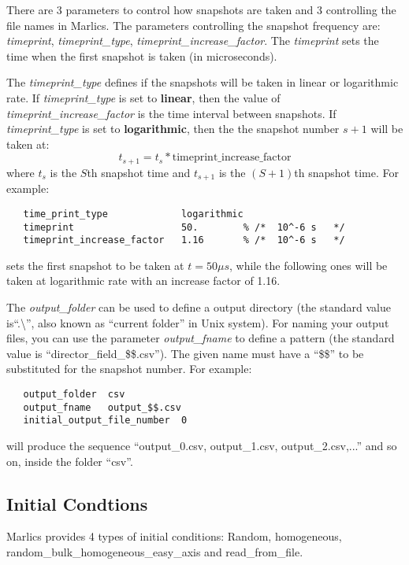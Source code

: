 \documentclass{article}
\begin{document}
There are 3 parameters to control how snapshots are taken and 3 controlling the file names in Marlics. The parameters controlling the snapshot frequency are: \textit{timeprint}, \textit{timeprint_type}, \textit{timeprint_increase_factor}. The \textit{timeprint} sets the time when the first snapshot is taken (in microseconds). 

The \textit{timeprint_type} defines if the snapshots will be taken in
linear or logarithmic rate.  If \textit{timeprint_type} is set to
\textbf{linear}, then the value of \textit{timeprint_increase_factor}
is the time interval between snapshots. If \textit{timeprint_type} is
set to \textbf{logarithmic}, then the the snapshot number $s+1$ will
be taken at:
\begin{equation}
  t_{s+1}=t_s *\textrm{timeprint_increase_factor}
\end{equation}
where $t_s$ is the $S$th snapshot time and $t_{s+1}$ is the $(S+1)$th snapshot time. For example:
\begin{lstlisting}
   time_print_type             logarithmic
   timeprint                   50.        % /*  10^-6 s   */
   timeprint_increase_factor   1.16       % /*  10^-6 s   */     
\end{lstlisting}
sets the first snapshot to be taken at $t=50 \mu s$, while the
following ones will be taken at logarithmic rate with an increase
factor of 1.16.


The \textit{output\_folder} can be used to define a output directory
(the standard value is``.\textbackslash'', also known as ``current
folder'' in Unix system).  For naming your output files, you can use
the parameter \textit{output\_fname} to define a pattern (the standard
value is ``director\_field\_\$\$.csv'').  The given name must have a
``\$\$'' to be substituted for the snapshot number. For example:
\begin{lstlisting}
   output_folder  csv
   output_fname   output_$$.csv
   initial_output_file_number  0	
\end{lstlisting}
will produce the sequence ``output\_0.csv, output\_1.csv, output\_2.csv,...'' and so on, inside the folder ``csv''.  


\subsection{Initial Condtions}\label{ic.params}

Marlics provides 4 types of initial conditions: Random, homogeneous, random_bulk_homogeneous_easy_axis and read_from_file.
\end{document}
